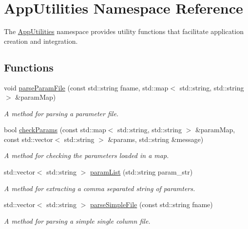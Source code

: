 \hypertarget{namespaceAppUtilities}{}\section{App\+Utilities Namespace Reference}
\label{namespaceAppUtilities}


The \hyperlink{namespaceAppUtilities}{App\+Utilities} namespace provides utility functions that facilitate application creation and integration.  


\subsection*{Functions}
\begin{DoxyCompactItemize}
\item 
void \hyperlink{namespaceAppUtilities_acc1e4029d959cb721fdd93a4fbc652df}{parse\+Param\+File} (const std\+::string fname, std\+::map$<$ std\+::string, std\+::string $>$ \&param\+Map)
\begin{DoxyCompactList}\small\item\em A method for parsing a parameter file. \end{DoxyCompactList}\item 
bool \hyperlink{namespaceAppUtilities_ad5b236fff03294eed3f7d7d325a0120c}{check\+Params} (const std\+::map$<$ std\+::string, std\+::string $>$ \&param\+Map, const std\+::vector$<$ std\+::string $>$ \&params, std\+::string \&message)
\begin{DoxyCompactList}\small\item\em A method for checking the parameters loaded in a map. \end{DoxyCompactList}\item 
std\+::vector$<$ std\+::string $>$ \hyperlink{namespaceAppUtilities_aa7a8c715b9f34da9c0ef8e743683dfc5}{param\+List} (std\+::string param\+\_\+str)
\begin{DoxyCompactList}\small\item\em A method for extracting a comma separated string of paramters. \end{DoxyCompactList}\item 
std\+::vector$<$ std\+::string $>$ \hyperlink{namespaceAppUtilities_a122dbc37274a53baca0ad1f152869180}{parse\+Simple\+File} (const std\+::string fname)
\begin{DoxyCompactList}\small\item\em A method for parsing a simple single column file. \end{DoxyCompactList}\item 

\end{DoxyCompactItemize}
